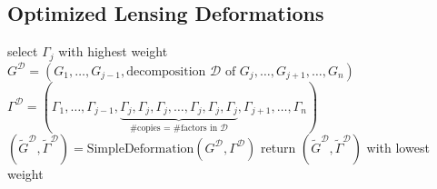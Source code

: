 \documentclass[reqno]{amsart}
\begin{document}
%
%





\subsection{Optimized Lensing Deformations}\label{subsec:algoLensing}
\begin{algorithm}[ht]
	\caption{Optimized Lensing Deformation}\label{algo:lensing}
	\begin{algorithmic}[1]
		\State select $\Gamma_j$ with highest weight
		\State $G^\mathcal{D} = (G_1,\dots,G_{j-1},\text{decomposition }\mathcal{D} \text{ of } G_j,\dots,G_{j+1},\dots,G_n)$
		\State $\Gamma^\mathcal{D} = (\Gamma_1,\dots,\Gamma_{j-1},\underbrace{\Gamma_j,\Gamma_j,\Gamma_j,\dots,\Gamma_j,\Gamma_j,\Gamma_j}_{\text{\# copies = \# factors in } \mathcal{D}},\Gamma_{j+1},\dots,\Gamma_n)$
			\State $(\tilde G^\mathcal{D},\tilde\Gamma^\mathcal{D}) = \text{SimpleDeformation}(G^\mathcal{D},\Gamma^\mathcal{D})$
		\EndFor
		\State return $(\tilde G^\mathcal{D},\tilde\Gamma^\mathcal{D})$ with lowest weight
		\EndProcedure
	\end{algorithmic}
\end{algorithm}
\end{document}
